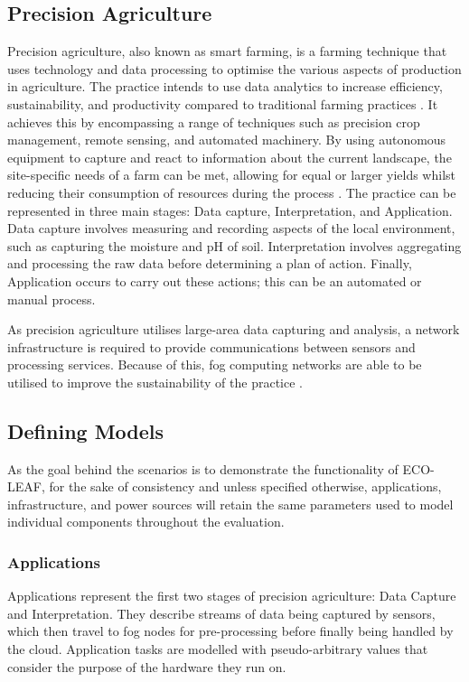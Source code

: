\documentclass{l4proj}
\begin{document}
\subsection{Precision Agriculture}\label{eval:subsec:precision-agriculture}
Precision agriculture, also known as smart farming, is a farming technique that uses technology and data processing to optimise the various aspects of production in agriculture.
The practice intends to use data analytics to increase efficiency, sustainability, and productivity compared to traditional farming practices \citep{precison-agriculture}.
It achieves this by encompassing a range of techniques such as precision crop management, remote sensing, and automated machinery.
By using autonomous equipment to capture and react to information about the current landscape, the site-specific needs of a farm can be met, allowing for equal or larger yields whilst reducing their consumption of resources during the process \citep{precison-agriculture}.
The practice can be represented in three main stages: Data capture, Interpretation, and Application.
Data capture involves measuring and recording aspects of the local environment, such as capturing the moisture and pH of soil.
Interpretation involves aggregating and processing the raw data before determining a plan of action.
Finally, Application occurs to carry out these actions; this can be an automated or manual process.

As precision agriculture utilises large-area data capturing and analysis, a network infrastructure is required to provide communications between sensors and processing services.
Because of this, fog computing networks are able to be utilised to improve the sustainability of the practice \citep{fog_smart_farming}.

\subsection{Defining Models}\label{eval:subsec:modelling}
As the goal behind the scenarios is to demonstrate the functionality of ECO-LEAF, for the sake of consistency and unless specified otherwise, applications, infrastructure, and power sources will retain the same parameters used to model individual components throughout the evaluation.
\subsubsection{Applications}
Applications represent the first two stages of precision agriculture: Data Capture and Interpretation.
They describe streams of data being captured by sensors, which then travel to fog nodes for pre-processing before finally being handled by the cloud.
Application tasks are modelled with pseudo-arbitrary values that consider the purpose of the hardware they run on.
\end{document}
